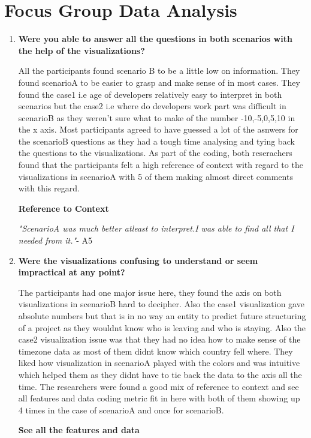 \documentclass[seploa]{beavtex}
\begin{document}
\section{Focus Group Data Analysis}
\begin{enumerate}
\item \textbf{Were you able to answer all the questions in both scenarios with the help of the visualizations?}

All the participants found scenario B to be a little low on information. They found scenarioA to be easier to grasp and make sense of in most cases. They found the case1 i.e age of developers relatively easy to interpret in both scenarios but the case2 i.e where do developers work part was difficult in scenarioB as they weren't sure what to make of the number -10,-5,0,5,10 in the x axis. Most participants agreed to have guessed a lot of the asnwers for the scenarioB questions as they had a tough time analysing and tying back the questions to the visualizations.
As part of the coding, both reserachers found that the participants felt a high reference of context with regard to the visualizations in scenarioA with 5 of them making almost direct comments with this regard.

\textbf{Reference to Context}

{\em "ScenarioA was much better atleast to interpret.I was able to find all that I needed from it."}- A5

\item \textbf{Were the visualizations confusing to understand or seem impractical at any point?}

The participants had one major issue here, they found the axis on both visualizations in scenarioB hard to decipher. Also the case1 visualization gave absolute numbers but that is in no way an entity to predict future structuring of a project as they wouldnt know who is leaving and who is staying. Also the case2 visualization issue was that they had no idea how to make sense of the timezone data as most of them didnt know which country fell where. They liked how visualization in scenarioA played with the colors and was intuitive which helped them as they didnt have to tie back the data to the axis all the time. The researchers were found a good mix of reference to context and see all features and data coding metric fit in here with both of them showing up 4 times in the case of scenarioA and once for scenarioB.

\textbf{See all the features and data}


\end{enumerate}
\end{document}
